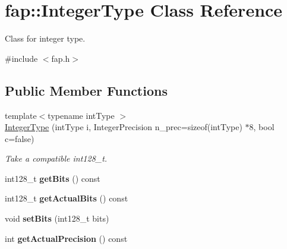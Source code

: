 \hypertarget{classfap_1_1IntegerType}{}\section{fap\+:\+:Integer\+Type Class Reference}
\label{classfap_1_1IntegerType}


Class for integer type.  




{\ttfamily \#include $<$fap.\+h$>$}

\subsection*{Public Member Functions}
\begin{DoxyCompactItemize}
\item 
\hypertarget{classfap_1_1IntegerType_aeac24f8c6a124e8ab4d8f233999b6e75}{}\label{classfap_1_1IntegerType_aeac24f8c6a124e8ab4d8f233999b6e75} 
{\footnotesize template$<$typename int\+Type $>$ }\\\hyperlink{classfap_1_1IntegerType_aeac24f8c6a124e8ab4d8f233999b6e75}{Integer\+Type} (int\+Type i, Integer\+Precision n\+\_\+prec=sizeof(int\+Type) $\ast$8, bool c=false)
\begin{DoxyCompactList}\small\item\em Take a compatible int128\+\_\+t. \end{DoxyCompactList}\item 
\hypertarget{classfap_1_1IntegerType_afbad8ab1cc63c0e9daf7c4e48daf665f}{}\label{classfap_1_1IntegerType_afbad8ab1cc63c0e9daf7c4e48daf665f} 
int128\+\_\+t {\bfseries get\+Bits} () const
\item 
\hypertarget{classfap_1_1IntegerType_aea461efbbd2a42cd9c2aeaa20821a39e}{}\label{classfap_1_1IntegerType_aea461efbbd2a42cd9c2aeaa20821a39e} 
int128\+\_\+t {\bfseries get\+Actual\+Bits} () const
\item 
\hypertarget{classfap_1_1IntegerType_a75227818e2b98aa0c38917783f3d942e}{}\label{classfap_1_1IntegerType_a75227818e2b98aa0c38917783f3d942e} 
void {\bfseries set\+Bits} (int128\+\_\+t bits)
\item 
\hypertarget{classfap_1_1IntegerType_a4704f69882690d796e62a7cbed28eee2}{}\label{classfap_1_1IntegerType_a4704f69882690d796e62a7cbed28eee2} 
int {\bfseries get\+Actual\+Precision} () const
\item 
\hypertarget{classfap_1_1IntegerType_a2958b19d948cadd0ede00b48b4dc0b24}{}\label{classfap_1_1IntegerType_a2958b19d948cadd0ede00b48b4dc0b24} 

\end{DoxyCompactItemize}

